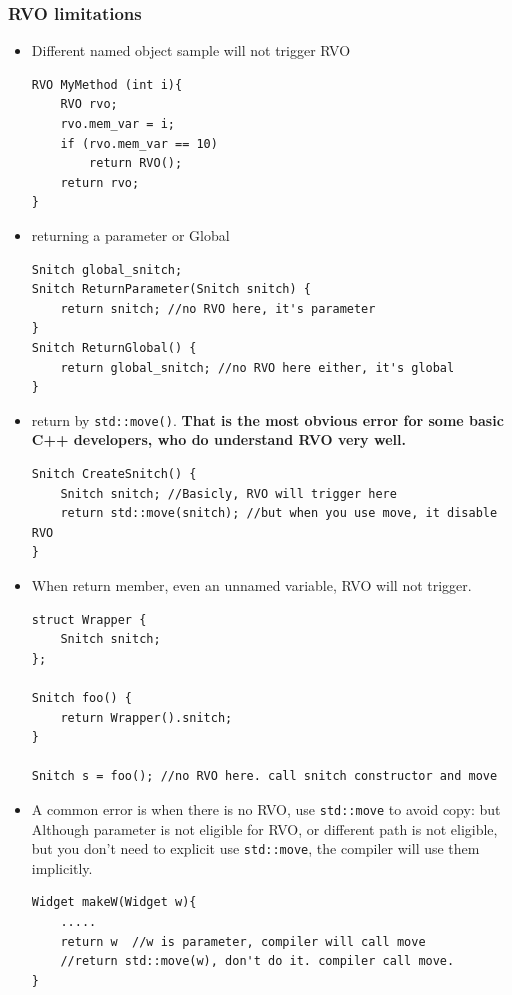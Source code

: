\documentclass[a4paper,11pt,twoside]{book}
\begin{document}
\subsubsection{RVO limitations}
\begin{itemize}
	\item Different named object sample will not trigger RVO
\begin{lstlisting}[numbers=none]
RVO MyMethod (int i){
	RVO rvo;
	rvo.mem_var = i;
	if (rvo.mem_var == 10)
		return RVO();
	return rvo; 
}
\end{lstlisting}
	
	\item returning a parameter or Global
\begin{lstlisting}[numbers=none]
Snitch global_snitch;
Snitch ReturnParameter(Snitch snitch) {
	return snitch; //no RVO here, it's parameter
}
Snitch ReturnGlobal() {
	return global_snitch; //no RVO here either, it's global
}
\end{lstlisting}

\item return by \texttt{std::move()}. \textbf{That is the most obvious error for some basic C++ developers, who do understand RVO very well.} 
\begin{lstlisting}[numbers=none]
Snitch CreateSnitch() {
	Snitch snitch; //Basicly, RVO will trigger here
	return std::move(snitch); //but when you use move, it disable RVO
}
\end{lstlisting}
	
\item When return member, even an unnamed variable, RVO will not trigger. 
\begin{lstlisting}[numbers=none]
struct Wrapper {
	Snitch snitch;
};

Snitch foo() {
	return Wrapper().snitch; 
}

Snitch s = foo(); //no RVO here. call snitch constructor and move
\end{lstlisting}

	\item A common error is when there is no RVO, use \texttt{std::move} to avoid copy: but Although parameter is not eligible for RVO, or different path is not eligible, but you don't need to explicit use \texttt{std::move}, the compiler will use them implicitly.

\begin{lstlisting}
Widget makeW(Widget w){
	.....
	return w  //w is parameter, compiler will call move 
	//return std::move(w), don't do it. compiler call move. 
} 	
\end{lstlisting}


\end{itemize}
\end{document}
